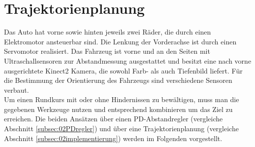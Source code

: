 \section{Trajektorienplanung}
\label{sec:trajektorienplanung}
Das Auto hat vorne sowie hinten jeweils zwei R\"ader, die durch einen Elektromotor ansteuerbar sind. Die Lenkung der Vorderachse ist durch einen Servomotor realisiert. Das Fahrzeug ist vorne und an den Seiten mit Ultraschallsensoren zur Abstandmessung ausgestattet und besitzt eine nach vorne ausgerichtete Kinect2 Kamera, die sowohl Farb- als auch Tiefenbild liefert. F\"ur die Bestimmung der Orientierung des Fahrzeugs sind verschiedene Sensoren verbaut. \\
Um einen Rundkurs mit oder ohne Hindernissen zu bew\"altigen, muss man die gegebenen Werkzeuge nutzen und entsprechend kombinieren um das Ziel zu erreichen. Die beiden Ans\"atzen \"uber einen PD-Abstandregler (vergleiche Abschnitt \ref{subsec:02PDregler}) und \"uber eine Trajektorienplanung (vergleiche Abschnitt \ref{subsec:02implementierung}) werden im Folgenden vorgestellt.







